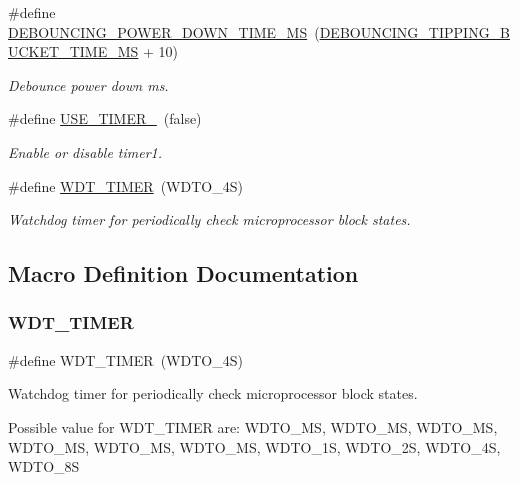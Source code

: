 \begin{DoxyCompactItemize}
\mbox{\label{i2c-rain-config_8h_a7b9497e328b8f872cd7677cfd02bbf65}} 
\#define \hyperlink{i2c-rain-config_8h_a7b9497e328b8f872cd7677cfd02bbf65}{D\+E\+B\+O\+U\+N\+C\+I\+N\+G\+\_\+\+P\+O\+W\+E\+R\+\_\+\+D\+O\+W\+N\+\_\+\+T\+I\+M\+E\+\_\+\+MS}~(\hyperlink{i2c-rain-config_8h_a96fb36600c0cea5d22644c26e2d1c7e8}{D\+E\+B\+O\+U\+N\+C\+I\+N\+G\+\_\+\+T\+I\+P\+P\+I\+N\+G\+\_\+\+B\+U\+C\+K\+E\+T\+\_\+\+T\+I\+M\+E\+\_\+\+MS} + 10)
\begin{DoxyCompactList}\small\item\em Debounce power down ms. \end{DoxyCompactList}\item 
\mbox{\label{i2c-rain-config_8h_a8051c2a569a9f9c488af89bce47ec306}} 
\#define \hyperlink{i2c-rain-config_8h_a8051c2a569a9f9c488af89bce47ec306}{U\+S\+E\+\_\+\+T\+I\+M\+E\+R\+\_}~(false)
\begin{DoxyCompactList}\small\item\em Enable or disable timer1. \end{DoxyCompactList}\item 
\#define \hyperlink{i2c-rain-config_8h_a983c9777673ee873f12ec9f489215321}{W\+D\+T\+\_\+\+T\+I\+M\+ER}~(W\+D\+T\+O\+\_\+4S)
\begin{DoxyCompactList}\small\item\em Watchdog timer for periodically check microprocessor block states. \end{DoxyCompactList}\end{DoxyCompactItemize}


\subsection{Macro Definition Documentation}
\mbox{\label{i2c-rain-config_8h_a983c9777673ee873f12ec9f489215321}} 
\subsubsection{\texorpdfstring{W\+D\+T\+\_\+\+T\+I\+M\+ER}{WDT\_TIMER}}
{\footnotesize\ttfamily \#define W\+D\+T\+\_\+\+T\+I\+M\+ER~(W\+D\+T\+O\+\_\+4S)}



Watchdog timer for periodically check microprocessor block states. 

Possible value for W\+D\+T\+\_\+\+T\+I\+M\+ER are\+: W\+D\+T\+O\+\_\+MS, W\+D\+T\+O\+\_\+MS, W\+D\+T\+O\+\_\+MS, W\+D\+T\+O\+\_\+MS, W\+D\+T\+O\+\_\+MS, W\+D\+T\+O\+\_\+MS, W\+D\+T\+O\+\_\+1S, W\+D\+T\+O\+\_\+2S, W\+D\+T\+O\+\_\+4S, W\+D\+T\+O\+\_\+8S 